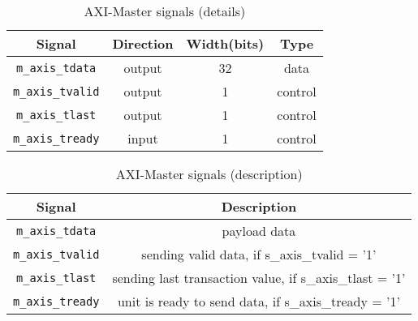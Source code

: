 \begin{table}
    \begin{tabular}{ | c | c | c | c |}
    \hline
Signal & Direction & Width(bits) & Type \\ \hline
{\tt m\_axis\_tdata} & output & 32 &  data \\ \hline
{\tt m\_axis\_tvalid} & output & 1 & control  \\ \hline
{\tt m\_axis\_tlast} & output & 1 & control \\  \hline
{\tt m\_axis\_tready} & input & 1 & control \\ 
    \hline
    \end{tabular}
	\caption{AXI-Master signals (details)}
    \label{t1a}
\end{table}

\begin{table}
    \begin{tabular}{ | c | c |}
    \hline
Signal & Description \\ \hline
{\tt m\_axis\_tdata} &  payload data \\ \hline
{\tt m\_axis\_tvalid} & sending valid data, if s\_axis\_tvalid = '1'  \\ \hline
{\tt m\_axis\_tlast} & sending last transaction value, if s\_axis\_tlast = '1' \\  \hline
{\tt m\_axis\_tready} & unit is ready to send data, if s\_axis\_tready = '1' \\ 
    \hline
    \end{tabular}
	\caption{AXI-Master signals (description)}
    \label{t1b}
\end{table}


